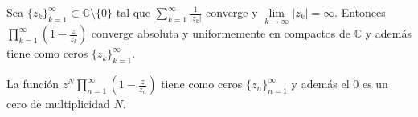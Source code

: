 \begin{theorem}
    Sea $\{z_k\}_{k=1}^\infty \subset \mathbb{C} \setminus \{0\}$ tal que $\sum_{k=1}^\infty \frac{1}{|z_k|}$ converge y $\lim\limits_{k \to \infty} |z_k| = \infty$.
    Entonces $\prod_{k=1}^\infty \left(1-\frac{z}{z_k}\right)$ converge absoluta y uniformemente en compactos de $\mathbb{C}$ y además tiene como ceros $\{z_k\}_{k=1}^\infty$.
\end{theorem}

\begin{remark}
    La función $z^N\prod_{n=1}^\infty \left(1-\frac{z}{z_n}\right)$ tiene como ceros $\{z_n\}_{n=1}^\infty$ y además el 0 es un cero de multiplicidad $N$.
\end{remark}